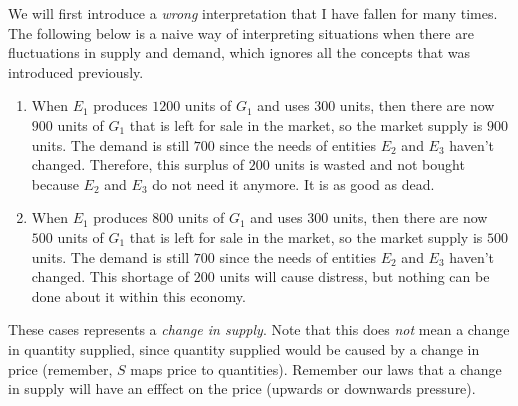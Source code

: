 \documentclass{article}
\begin{document}
    We will first introduce a \textit{wrong} interpretation that I have fallen for many times. The following below is a naive way of interpreting situations when there are fluctuations in supply and demand, which ignores all the concepts that was introduced previously.

    \begin{enumerate}
      \item When $E_1$ produces $1200$ units of $G_1$ and uses $300$ units, then there are now $900$ units of $G_1$ that is left for sale in the market, so the market supply is $900$ units. The demand is still $700$ since the needs of entities $E_2$ and $E_3$ haven't changed. Therefore, this surplus of $200$ units is wasted and not bought because $E_2$ and $E_3$ do not need it anymore. It is as good as dead.
      \item When $E_1$ produces $800$ units of $G_1$ and uses $300$ units, then there are now $500$ units of $G_1$ that is left for sale in the market, so the market supply is $500$ units. The demand is still $700$ since the needs of entities $E_2$ and $E_3$ haven't changed. This shortage of $200$ units will cause distress, but nothing can be done about it within this economy.
    \end{enumerate}

    These cases represents a \textit{change in supply}. Note that this does \textit{not} mean a change in quantity supplied, since quantity supplied would be caused by a change in price (remember, $S$ maps price to quantities). Remember our laws that a change in supply will have an efffect on the price (upwards or downwards pressure).
\end{document}
